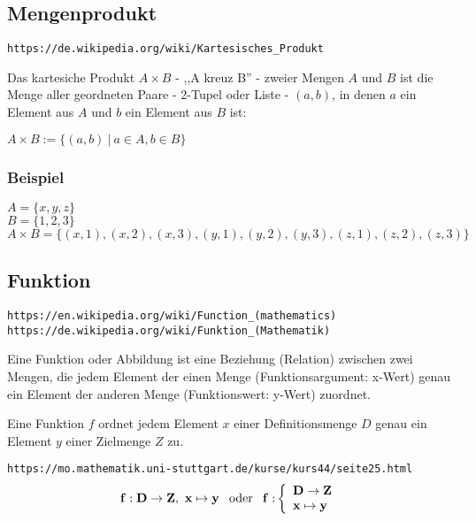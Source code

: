 \documentclass[10pt,a4paper]{article}
\begin{document}
\subsection {Mengenprodukt}

\verb+https://de.wikipedia.org/wiki/Kartesisches_Produkt+
\vskip 8pt

Das kartesiche Produkt $A \times B$ - ,,A kreuz B'' - zweier Mengen $A$ und $B$
ist die Menge aller geordneten Paare - 2-Tupel oder Liste - $(a, b)$, in denen $a$
ein Element aus $A$ und $b$ ein Element aus $B$ ist:
\vskip 8pt

$A \times B := \{ (a, b)\ |\ a \in A, b \in B \}$


\subsubsection{Beispiel}

$A = \{x, y, z\}$ \\
$B = \{1, 2, 3\}$ \\
$A \times B = \{ (x, 1), (x, 2), (x, 3), (y, 1), (y, 2), (y, 3), (z, 1), (z, 2), (z, 3) \}$


    
\subsection {Funktion}

\verb+https://en.wikipedia.org/wiki/Function_(mathematics)+ \\
\verb+https://de.wikipedia.org/wiki/Funktion_(Mathematik)+
\vskip 8pt

Eine Funktion oder Abbildung ist eine Beziehung (Relation) zwischen zwei Mengen,
die jedem Element der einen Menge (Funktionsargument: x-Wert) genau ein Element
der anderen Menge (Funktionswert: y-Wert) zuordnet.

\vskip 8pt
Eine Funktion $f$ ordnet jedem Element $x$ einer Definitionsmenge $D$ genau ein
Element $y$ einer Zielmenge $Z$ zu.

\vskip 8pt
\verb+https://mo.mathematik.uni-stuttgart.de/kurse/kurs44/seite25.html+
\vskip 8pt
  \[
  {\bf f: D \rightarrow Z,\ x \mapsto y \hskip 8pt} {\rm oder} \hskip 8pt {\bf f:}
  \left\{%
    \begin{array}{ll}
      {\bf D \rightarrow Z} \\
      {\bf x \mapsto y}
    \end{array}
  \right.
  \]
\end{document}
